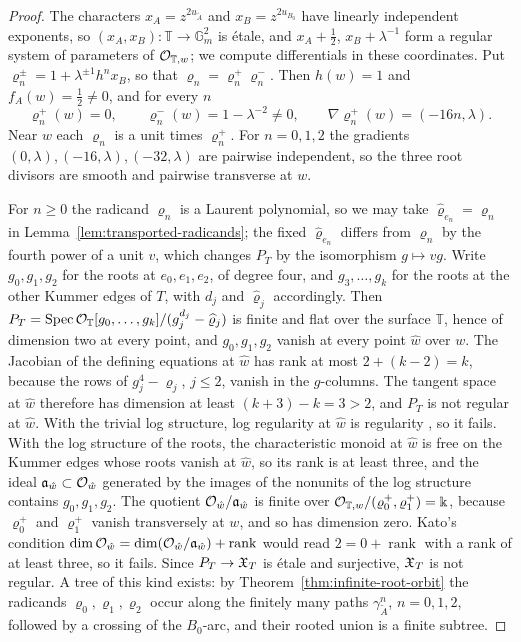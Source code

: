 \begin{proof}
The characters $x_A=z^{2u_{\widetilde A}}$ and $x_B=z^{2u_{B_0}}$ have
linearly independent exponents, so $(x_A,x_B):\mathbb T\to\mathbb G_m^2$ is
\'etale, and $x_A+\frac12$, $x_B+\lambda^{-1}$ form a regular system of
parameters of $\mathcal O_{\mathbb T,w}$; we compute differentials in these coordinates.
Put $\varrho_n^\pm=1+\lambda^{\pm1}h^nx_B$, so that
$\varrho_n=\varrho_n^+\varrho_n^-$.  Then $h(w)=1$ and $f_A(w)=\tfrac12\neq0$,
and for every $n$
\[
 \varrho_n^+(w)=0,\qquad \varrho_n^-(w)=1-\lambda^{-2}\neq0,\qquad
 \nabla\varrho_n^+(w)=(-16n,\lambda).
\]
Near $w$ each $\varrho_n$ is a unit times $\varrho_n^+$.  For $n=0,1,2$ the
gradients $(0,\lambda),(-16,\lambda),(-32,\lambda)$ are pairwise
independent, so the three root divisors are smooth and pairwise transverse
at $w$.

For $n\geq0$ the radicand $\varrho_n$ is a Laurent polynomial, so we may
take $\widehat\varrho_{e_n}=\varrho_n$ in Lemma~\ref{lem:transported-radicands}; the
fixed $\widehat\varrho_{e_n}$ differs from $\varrho_n$ by the fourth power of a unit
$v$, which changes $P_T$ by the isomorphism $g\mapsto vg$.  Write
$g_0,g_1,g_2$ for the roots at $e_0,e_1,e_2$, of degree four, and
$g_3,\ldots,g_k$ for the roots at the other Kummer edges of $T$, with $d_j$
and $\widehat\varrho_j$ accordingly.  Then
$P_T=\operatorname{Spec}\mathcal O_{\mathbb T}[g_0,\ldots,g_k]/(g_j^{d_j}-\widehat\varrho_j)$ is finite and flat
over the surface $\mathbb T$, hence of dimension two at every point, and
$g_0,g_1,g_2$ vanish at every point $\hat w$ over $w$.  The Jacobian of the
defining equations at $\hat w$ has rank at most $2+(k-2)=k$, because the
rows of $g_j^4-\varrho_j$, $j\leq2$, vanish in the $g$-columns.  The tangent
space at $\hat w$ therefore has dimension at least $(k+3)-k=3>2$, and $P_T$
is not regular at $\hat w$.  With the trivial log structure, log regularity
at $\hat w$ is regularity \cite[Def.~2.1]{kato1994toric}, so it fails.  With
the log structure of the roots, the characteristic monoid at $\hat w$ is
free on the Kummer edges whose roots vanish at $\hat w$, so its rank is at
least three, and the ideal $\mathfrak a_{\hat w}\subset\mathcal O_{\hat w}$
generated by the images of the nonunits of the log structure contains
$g_0,g_1,g_2$.  The quotient $\mathcal O_{\hat w}/\mathfrak a_{\hat w}$ is finite
over $\mathcal O_{\mathbb T,w}/(\varrho_0^+,\varrho_1^+)=\Bbbk$, because $\varrho_0^+$ and
$\varrho_1^+$ vanish transversely at $w$, and so has dimension zero.  Kato's
condition
$\dim\mathcal O_{\hat w}=\dim(\mathcal O_{\hat w}/\mathfrak a_{\hat w})+\operatorname{rank}$
\cite[Def.~2.1]{kato1994toric} would read $2=0+\operatorname{rank}$ with a
rank of at least three, so it fails.  Since $P_T\to\mathfrak X_T$ is \'etale and
surjective, $\mathfrak X_T$ is not regular.  A tree of this kind exists: by
Theorem~\ref{thm:infinite-root-orbit} the radicands
$\varrho_0,\varrho_1,\varrho_2$ occur along the finitely many paths
$\gamma_{\widetilde A}^n$, $n=0,1,2$, followed by a crossing of the
$B_0$-arc, and their rooted union is a finite subtree.
\end{proof}

